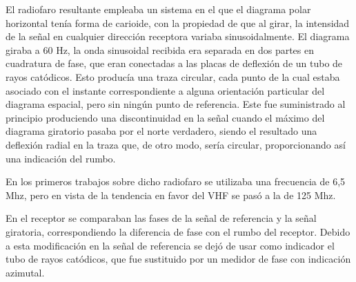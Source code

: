 El radiofaro resultante empleaba un sistema en el que el diagrama polar horizontal ten\'ia forma de carioide, con la propiedad de que al girar, la intensidad de la se\~nal en cualquier direcci\'on receptora variaba sinusoidalmente. El diagrama giraba a 60 Hz, la onda sinusoidal recibida era separada en dos partes en cuadratura de fase, que eran conectadas a las placas de deflexi\'on de un tubo de rayos cat\'odicos. Esto produc\'ia una traza circular, cada punto de la cual estaba asociado con el instante correspondiente a alguna orientaci\'on particular del diagrama espacial, pero sin ning\'un punto de referencia. Este fue suministrado al principio produciendo una discontinuidad en la se\~nal cuando el m\'aximo del diagrama giratorio pasaba por el norte verdadero, siendo el resultado una deflexi\'on radial en la traza que, de otro modo, ser\'ia circular, proporcionando as\'i una indicaci\'on del rumbo.

En los primeros trabajos sobre dicho radiofaro se utilizaba una frecuencia de 6,5 Mhz, pero en vista de la tendencia en favor del VHF se pas\'o a la de 125 Mhz.

En el receptor se comparaban las fases de la se\~nal de referencia y la se\~nal giratoria, correspondiendo la diferencia de fase con el rumbo del receptor. Debido a esta modificaci\'on en la se\~nal de referencia se dej\'o de usar como indicador el tubo de rayos cat\'odicos, que fue sustituido por un medidor de fase con indicaci\'on azimutal.
